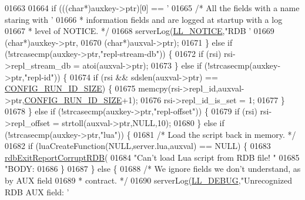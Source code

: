 \begin{DoxyCode}
{{{{{{{{{{{{{{{{{{{{{{{{{{{{{01663 
01664             \textcolor{keywordflow}{if} (((\textcolor{keywordtype}{char}*)auxkey->ptr)[0] == \textcolor{stringliteral}{'%
01665                 \textcolor{comment}{/* All the fields with a name staring with '%
01666 \textcolor{comment}{                 * information fields and are logged at startup with a log}
01667 \textcolor{comment}{                 * level of NOTICE. */}
01668                 serverLog(\hyperlink{server_8h_a8c54c191e436c7dd3012167212692401}{LL\_NOTICE},\textcolor{stringliteral}{"RDB '%
01669                     (\textcolor{keywordtype}{char}*)auxkey->ptr,
01670                     (\textcolor{keywordtype}{char}*)auxval->ptr);
01671             \} \textcolor{keywordflow}{else} \textcolor{keywordflow}{if} (!strcasecmp(auxkey->ptr,\textcolor{stringliteral}{"repl-stream-db"})) \{
01672                 \textcolor{keywordflow}{if} (rsi) rsi->repl\_stream\_db = atoi(auxval->ptr);
01673             \} \textcolor{keywordflow}{else} \textcolor{keywordflow}{if} (!strcasecmp(auxkey->ptr,\textcolor{stringliteral}{"repl-id"})) \{
01674                 \textcolor{keywordflow}{if} (rsi && sdslen(auxval->ptr) == \hyperlink{server_8h_aba6794fa3ee28f85165eaed93190f1df}{CONFIG\_RUN\_ID\_SIZE}) \{
01675                     memcpy(rsi->repl\_id,auxval->ptr,\hyperlink{server_8h_aba6794fa3ee28f85165eaed93190f1df}{CONFIG\_RUN\_ID\_SIZE}+1);
01676                     rsi->repl\_id\_is\_set = 1;
01677                 \}
01678             \} \textcolor{keywordflow}{else} \textcolor{keywordflow}{if} (!strcasecmp(auxkey->ptr,\textcolor{stringliteral}{"repl-offset"})) \{
01679                 \textcolor{keywordflow}{if} (rsi) rsi->repl\_offset = strtoll(auxval->ptr,NULL,10);
01680             \} \textcolor{keywordflow}{else} \textcolor{keywordflow}{if} (!strcasecmp(auxkey->ptr,\textcolor{stringliteral}{"lua"})) \{
01681                 \textcolor{comment}{/* Load the script back in memory. */}
01682                 \textcolor{keywordflow}{if} (luaCreateFunction(NULL,server.lua,auxval) == NULL) \{
01683                     \hyperlink{rdb_8c_afb34e310c0e5dfd9f8c2bebbec59c7f7}{rdbExitReportCorruptRDB}(
01684                         \textcolor{stringliteral}{"Can't load Lua script from RDB file! "}
01685                         \textcolor{stringliteral}{"BODY: %
01686                 \}
01687             \} \textcolor{keywordflow}{else} \{
01688                 \textcolor{comment}{/* We ignore fields we don't understand, as by AUX field}
01689 \textcolor{comment}{                 * contract. */}
01690                 serverLog(\hyperlink{server_8h_abcaffe365dee628fcf9fc90c69d534a1}{LL\_DEBUG},\textcolor{stringliteral}{"Unrecognized RDB AUX field: '%
}}}}}}}}}}}}}}}}}}}}}}}}}}}}}}}}}}
\end{DoxyCode}
